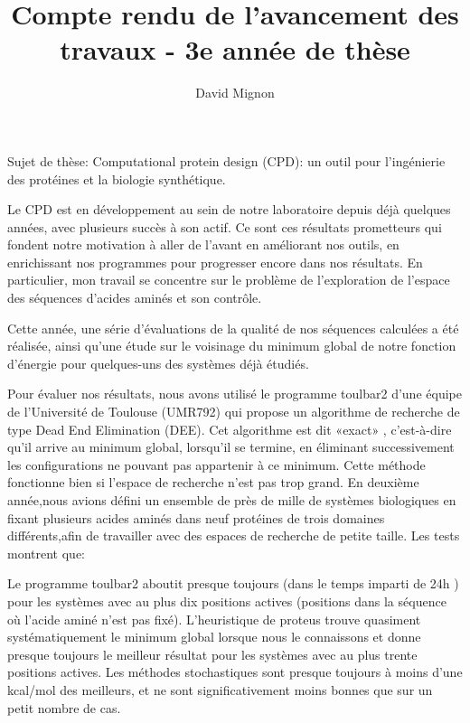 \documentclass[a4paper,11pt]{article}
\title{Compte rendu de l'avancement des travaux - 3e année de thèse}
\author{David Mignon}
\begin{document}
\maketitle


\begin{spacing}{1.0}

  Sujet de thèse:
  Computational protein design (CPD): un outil pour l'ingénierie des protéines et la biologie synthétique.


  Le CPD est en développement au sein de notre laboratoire depuis déjà quelques années, avec plusieurs succès à son actif.
  Ce sont ces résultats prometteurs qui fondent notre motivation à aller de l'avant en améliorant nos outils, en enrichissant 
  nos programmes pour progresser encore dans nos résultats. En particulier, mon travail se concentre sur le problème de l'exploration de l'espace des séquences d'acides aminés et son contrôle.

  Cette année, une série d'évaluations de la qualité de nos séquences calculées a été réalisée, ainsi qu'une étude sur le voisinage du minimum global de notre fonction d'énergie pour quelques-uns des systèmes déjà étudiés.

  Pour évaluer nos résultats, nous avons utilisé le programme toulbar2 d'une équipe de l'Université de Toulouse (UMR792) qui propose un algorithme de recherche de type Dead End Elimination (DEE). Cet algorithme est dit «exact» , c'est-à-dire qu'il arrive au minimum global, lorsqu'il se termine, en éliminant successivement les configurations ne pouvant pas appartenir à ce minimum. Cette méthode fonctionne bien si l'espace de recherche  n'est pas trop grand. En deuxième année,nous avions défini un ensemble de près de mille de systèmes biologiques en fixant plusieurs acides aminés dans neuf protéines de trois domaines différents,afin de travailler avec des espaces de recherche de petite taille. Les tests montrent que:

Le programme toulbar2 aboutit presque toujours (dans le temps imparti de 24h ) pour les systèmes avec au plus dix positions actives (positions dans la séquence où l'acide aminé n'est pas fixé).
L'heuristique de proteus trouve quasiment systématiquement le minimum global lorsque nous le connaissons et donne presque toujours le meilleur résultat pour les systèmes avec au plus trente positions actives.
Les méthodes stochastiques sont presque toujours à moins d'une kcal/mol des meilleurs, et ne sont significativement moins bonnes que sur un petit nombre de cas.


\end{spacing}
\end{document}
